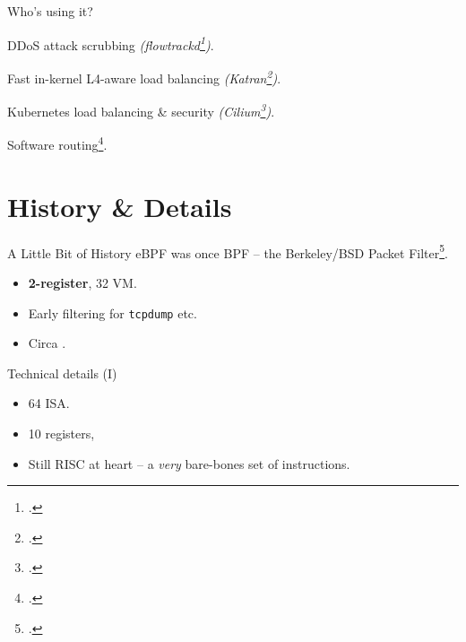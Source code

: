 \documentclass[aspectratio=169,xcolor={dvipsnames}
,handout %
]{beamer}
\begin{document}
\begin{frame}{Who's using it?}
	\begin{description}[<+->]
		\item[Cloudflare] \alert{DDoS attack scrubbing} \emph{(flowtrackd\footcite{flowtrackd})}.
		
		\item[Meta] Fast in-kernel \alert{L4-aware load balancing} \emph{(Katran\footcite{katran})}.
		
		\item[Google, AWS, ...] \alert{Kubernetes load balancing \& security} \emph{(Cilium\footcite{cilium})}.
		
		\item[Open vSwitch] \alert{Software routing}\footcite{DBLP:conf/sigcomm/TuWAP21}.
	\end{description}
	
\end{frame}

\section{History \& Details}

\begin{frame}{A Little Bit of History}
	eBPF was once \alert{BPF} -- the Berkeley/BSD Packet Filter\footcite{DBLP:conf/usenix/McCanneJ93}.
	\begin{itemize}[<+->]
		\item \textbf{2-register}, \qty{32}{\bit} VM.
		\item Early filtering for \texttt{tcpdump} etc.
		\item Circa \citeyear{DBLP:conf/usenix/McCanneJ93}.
	\end{itemize}
\end{frame}


\begin{frame}{Technical details (I)}
	\begin{itemize}[<+->]
		\item \qty{64}{\bit} ISA.
		\item 10 registers,
		\item Still RISC at heart -- a \emph{very} bare-bones set of instructions.
	\end{itemize}
\end{frame}
\end{document}
